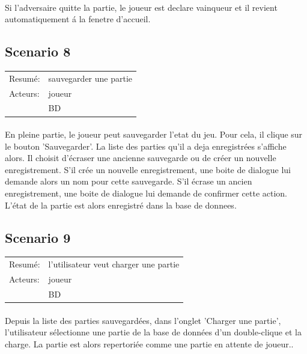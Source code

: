 \documentclass[french,12pt]{report}
\begin{document}
\paragraph{}   
  Si l'adversaire quitte la partie, le joueur est declare vainqueur et 
il revient automatiquement \'a la fenetre d'accueil.



\subsection*{Scenario 8}

\begin{tabular}{ll}
  Resum\'e: & sauvegarder une partie \\
  Acteurs: & joueur \\
	   & BD
\end{tabular}

\paragraph{}    
  En pleine partie, le joueur peut sauvegarder l'etat du jeu. Pour cela, 
il clique sur le bouton 'Sauvegarder'. La liste des parties qu'il a deja 
enregistr\'ees s'affiche alors. Il choisit d'\'ecraser une ancienne 
sauvegarde ou de cr\'eer un nouvelle enregistrement. 
  S'il cr\'ee un nouvelle enregistrement, une boite de dialogue lui demande 
alors un nom pour cette sauvegarde.
  S'il \'ecrase un ancien enregistrement, une boite de dialogue lui demande 
de confirmer cette action.
  L'\'etat de la partie est alors enregistr\'e dans la base de donnees.


\subsection*{Scenario 9}

\begin{tabular}{ll}
  Resum\'e: & l'utilisateur veut charger une partie \\
  Acteurs: & joueur \\
	   & BD
\end{tabular}

\paragraph{} 
  Depuis la liste des parties sauvegard\'ees, dans l'onglet 
'Charger une partie', l'utilisateur s\'electionne une partie de la base 
de donn\'ees d'un double-clique et la charge.
  La partie est alors repertori\'ee comme une partie en attente de joueur..
\end{document}

